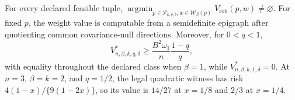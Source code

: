 For every declared feasible tuple, \(\operatorname*{argmin}_{p\in\mathcal P_{k,q,\delta}, w\in\mathcal W_\beta(p)}V_{\mathrm{rob}}(p,w)\neq\varnothing\). For fixed \(p\), the weight value is computable from a semidefinite epigraph after quotienting common covariance-null directions. Moreover, for \(0<q<1\), \[V^*_{n,\beta,k,q,\delta}\ge \frac{B^2\omega_1}{n}\frac{1-q}{q},\] with equality throughout the declared class when \(\beta=1\), while \(V^*_{n,\beta,k,1,\delta}=0\). At \(n=3\), \(\beta=k=2\), and \(q=1/2\), the legal quadratic witness has risk \(4(1-x)/\{9(1-2x)\}\), so its value is \(14/27\) at \(x=1/8\) and \(2/3\) at \(x=1/4\).